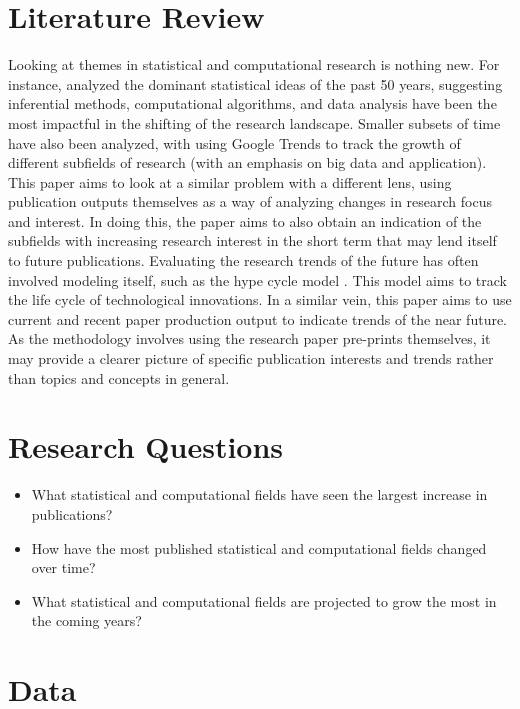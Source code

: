\documentclass[
  12pt]{article}
\providecommand{\tightlist}{%
  \setlength{\itemsep}{0pt}\setlength{\parskip}{0pt}}\usepackage{longtable,booktabs,array}
\begin{document}
\section{Literature Review}\label{lit-review}

Looking at themes in statistical and computational research is nothing
new. For instance, \citet{gelm:veht:2021} analyzed the dominant
statistical ideas of the past 50 years, suggesting inferential methods,
computational algorithms, and data analysis have been the most impactful
in the shifting of the research landscape. Smaller subsets of time have
also been analyzed, with \citet{jun:yoo:choi:2018} using Google Trends
to track the growth of different subfields of research (with an emphasis
on big data and application). This paper aims to look at a similar
problem with a different lens, using publication outputs themselves as a
way of analyzing changes in research focus and interest. In doing this,
the paper aims to also obtain an indication of the subfields with
increasing research interest in the short term that may lend itself to
future publications. Evaluating the research trends of the future has
often involved modeling itself, such as the hype cycle model
\citet{dedehayir:2016}. This model aims to track the life cycle of
technological innovations. In a similar vein, this paper aims to use
current and recent paper production output to indicate trends of the
near future. As the methodology involves using the research paper
pre-prints themselves, it may provide a clearer picture of specific
publication interests and trends rather than topics and concepts in
general.

\section{Research Questions}\label{sec-questions}

\begin{itemize}
\tightlist
\item
  What statistical and computational fields have seen the largest
  increase in publications?
\item
  How have the most published statistical and computational fields
  changed over time?
\item
  What statistical and computational fields are projected to grow the
  most in the coming years?
\end{itemize}

\section{Data}\label{sec-data}
\end{document}
